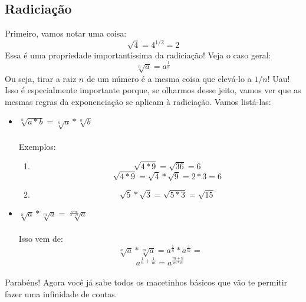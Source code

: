 \documentclass{article}
\begin{document}
\subsection{Radiciação}
Primeiro, vamos notar uma coisa: 
$$\sqrt{4} = 4^{1/2} = 2$$
Essa é uma propriedade importantíssima da radiciação! Veja o caso geral:
$$\sqrt[n]{a} = a^{\frac{1}{a}}$$
Ou seja, tirar a raiz $n$ de um número é a mesma coisa que elevá-lo a $1/n$!
Uau! Isso é especialmente importante porque, se olharmos desse jeito, vamos
ver que as mesmas regras da exponenciação se aplicam à radiciação. Vamos 
listá-las:
\begin{itemize}
	\item $\sqrt[n]{a*b} = \sqrt[n]{a}*\sqrt[n]{b}$
	\paragraph{}
	Exemplos:
	\begin{enumerate}
		\item 
		$$\sqrt{4*9} = \sqrt{36} = 6$$
		$$\sqrt{4*9} = \sqrt{4}*\sqrt{9} = 2*3 = 6$$
		\item
		$$\sqrt{5}*\sqrt{3} = \sqrt{5*3} = \sqrt{15}$$
	\end{enumerate}
	\item $\sqrt[n]{a}*\sqrt[m]{a} = \sqrt[\frac{n*m}{n+m}]{a}$
	\paragraph{}
	Isso vem de:
	$$\sqrt[n]{a}*\sqrt[m]{a} = a^{\frac{1}{n}}*a^{\frac{1}{m}} = $$
	$$a^{\frac{1}{n} + \frac{1}{m}} = a^{\frac{m+n}{m*n}}$$
\end{itemize}

\paragraph{}
Parabéns! Agora você já sabe todos os macetinhos básicos que vão te permitir
fazer uma infinidade de contas.
\end{document}
